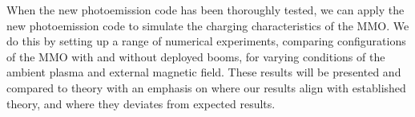 When the new photoemission code has been thoroughly tested, we can apply the new photoemission code to simulate the charging characteristics of the MMO. We do this by setting up a range of numerical experiments, comparing configurations of the MMO with and without deployed booms, for varying conditions of the ambient plasma and external magnetic field. These results will be presented and compared to theory with an emphasis on where our results align with established theory, and where they deviates from expected results. 
\newpage